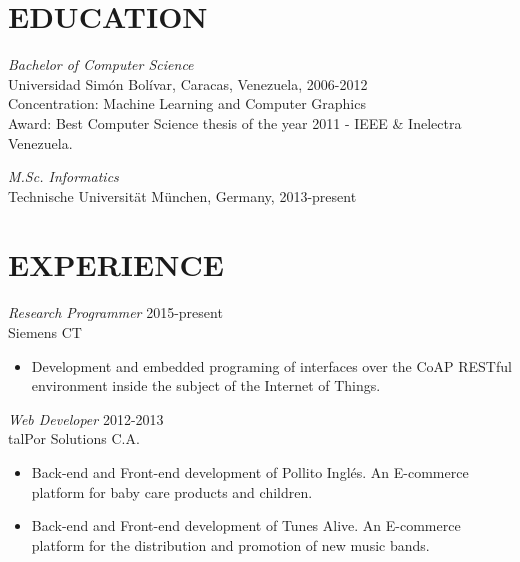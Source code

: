 \documentclass[margin, 10pt]{res} %
\begin{document}
\begin{resume}


\section{EDUCATION}

{\sl Bachelor of Computer Science} \\
Universidad Sim\'on Bol\'ivar, Caracas, Venezuela, 2006-2012\\
Concentration: Machine Learning and Computer Graphics \\
Award: Best Computer Science thesis of the year 2011 - IEEE \& Inelectra Venezuela.
 
{\sl M.Sc. Informatics} \\
Technische Universit\"at M\"unchen, Germany, 2013-present\\
 
 
\section{EXPERIENCE}

{\sl Research Programmer} \hfill 2015-present \\
Siemens CT

\begin{itemize} \itemsep -2pt %
\item Development and embedded programing of interfaces over the CoAP RESTful 
    environment inside the subject of the Internet of Things.
\end{itemize}

{\sl Web Developer} \hfill 2012-2013 \\
talPor Solutions C.A.

\begin{itemize} \itemsep -2pt %
\item Back-end and Front-end development of Pollito Ingl\'es. An E-commerce 
    platform for baby care products and children.
\item Back-end and Front-end development of Tunes Alive. An E-commerce platform
    for the distribution and promotion of new music bands.
\end{itemize}
 

\end{resume}
\end{document}
